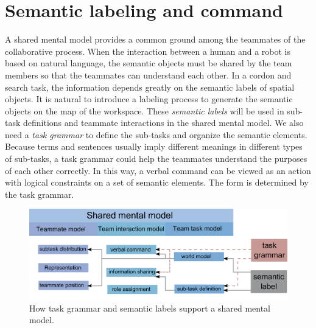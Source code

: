 \section{Semantic labeling and command}
\label{sec:semantic}


A shared mental model provides a common ground among the teammates of the collaborative process.
When the interaction between a human and a robot is based on natural language, the semantic objects must be shared by the team members so that the teammates can understand each other.
In a cordon and search task, the information depends greatly on the semantic labels of spatial objects.
It is natural to introduce a labeling process to generate the semantic objects on the map of the workspace.
These \emph{semantic labels} will be used in sub-task definitions and teammate interactions in the shared mental model.
We also need a \emph{task grammar} to define the sub-tasks and organize the semantic elements. 
Because terms and sentences usually imply different meanings in different types of sub-tasks, a task grammar could help the teammates understand the purposes of each other correctly.
In this way, a verbal command can be viewed as an action with logical constraints on a set of semantic elements. 
The form is determined by the task grammar. 

\begin{figure}
\centering
\includegraphics[width=0.7\linewidth]{./images/smm}
\caption{How task grammar and semantic labels support a shared mental model.}
\label{fig:smm}
\end{figure}

